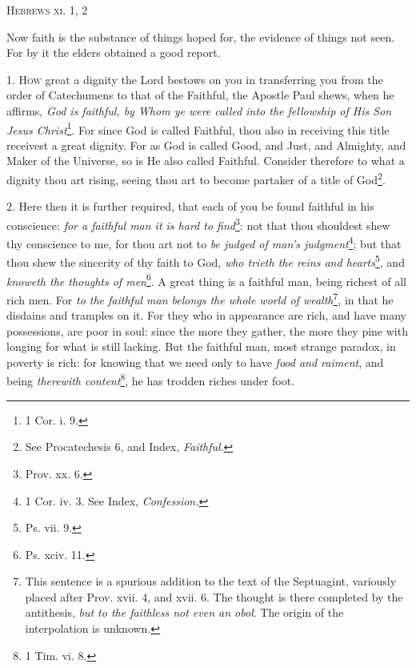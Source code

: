 
\textsc{Hebrews xi. 1, 2}

Now faith is the substance of things hoped for, the evidence of things not seen. For by it the elders obtained a good report.

1. \textsc{How} great a dignity the Lord bestows on you in transferring you from the order of Catechumens to that of the Faithful, the Apostle Paul shews, when he affirms, \emph{God is faithful, by Whom ye were called into the fellowship of His Son Jesus Christ}\footnote{1 Cor. i. 9.}. For since God is called Faithful, thou also in receiving this title receivest a great dignity. For as God is called Good, and Just, and Almighty, and Maker of the Universe, so is He also called Faithful. Consider therefore to what a dignity thou art rising, seeing thou art to become partaker of a title of God\footnote{See Procatechesis 6, and Index, \emph{Faithful}.}.

2. Here then it is further required, that each of you be found faithful in his conscience: \emph{for a faithful man it is hard to find}\footnote{Prov. xx. 6.}: not that thou shouldest shew thy conscience to me, for thou art not to \emph{be judged of man’s judgment}\footnote{1 Cor. iv. 3. See Index, \emph{Confession.}}; but that thou shew the sincerity of thy faith to God, \emph{who trieth the reins and hearts}\footnote{Ps. vii. 9.}, and \emph{knoweth the thoughts of men}\footnote{Ps. xciv. 11.}. A great thing is a faithful man, being richest of all rich men. For \emph{to the faithful man belongs the whole world of wealth}\footnote{This sentence is a spurious addition to the text of the Septuagint, variously placed after Prov. xvii. 4, and xvii. 6. The thought is there completed by the antithesis, \emph{but to the faithless not even an obol}. The origin of the interpolation is unknown.}, in that he disdains and tramples on it. For they who in appearance are rich, and have many possessions, are poor in soul: since the more they gather, the more they pine with longing for what is still lacking. But the faithful man, most strange paradox, in poverty is rich: for knowing that we need only to have \emph{food and raiment}, and being \emph{therewith content}\footnote{1 Tim. vi. 8.}, he has trodden riches under foot.

